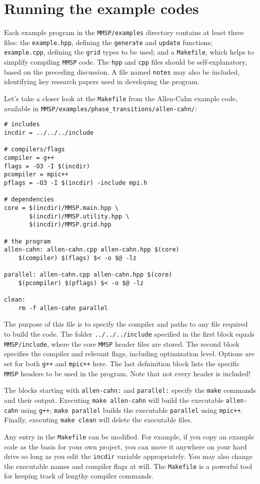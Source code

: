 \section{Running the example codes}
Each example program in the {\tt MMSP/examples} directory contains at least three files: the {\tt example.hpp}, defining the {\tt generate} and {\tt update} functions; {\tt example.cpp}, defining the {\tt grid} types to be used; and a {\tt Makefile}, which helps to simplify compiling {\tt MMSP} code.  The {\tt hpp} and {\tt cpp} files should be self-explanatory, based on the preceding discussion.  A file named {\tt notes} may also be included, identifying key research papers used in developing the program.

Let's take a closer look at the {\tt Makefile} from the Allen-Cahn example code, available in {\tt MMSP/examples/phase\_transitions/allen-cahn/}:
\begin{shadebox}
\begin{verbatim}
# includes
incdir = ../../../include

# compilers/flags
compiler = g++
flags = -O3 -I $(incdir)
pcompiler = mpic++
pflags = -O3 -I $(incdir) -include mpi.h

# dependencies
core = $(incdir)/MMSP.main.hpp \
       $(incdir)/MMSP.utility.hpp \
       $(incdir)/MMSP.grid.hpp

# the program
allen-cahn: allen-cahn.cpp allen-cahn.hpp $(core)
	$(compiler) $(flags) $< -o $@ -lz

parallel: allen-cahn.cpp allen-cahn.hpp $(core)
	$(pcompiler) $(pflags) $< -o $@ -lz

clean:
	rm -f allen-cahn parallel
\end{verbatim}
\end{shadebox}
The purpose of this file is to specify the compiler and paths to any file required to build the code.  The folder {\tt ../../../include} specified in the first block equals {\tt MMSP/include}, where the core {\tt MMSP} header files are stored.  The second block specifies the compiler and relevant flags, including optimization level.  Options are set for both {\tt g++} and {\tt mpic++} here.  The last defninition block lists the specific {\tt MMSP} headers to be used in the program.  Note that not every header is included!

The blocks starting with {\tt allen-cahn:} and {\tt parallel:} specify the {\tt make} commands and their output.  Executing {\tt make allen-cahn} will build the executable {\tt allen-cahn} using {\tt g++}; {\tt make parallel} builds the executable {\tt parallel} using {\tt mpic++}.  Finally, executing {\tt make clean} will delete the executable files.

Any entry in the {\tt Makefile} can be modified.  For example, if you copy an example code as the basis for your own project, you can move it anywhere on your hard drive so long as you edit the {\tt incdir} variable appropriately.  You may also change the executable names and compiler flags at will.  The {\tt Makefile} is a powerful tool for keeping track of lengthy compiler commands.
